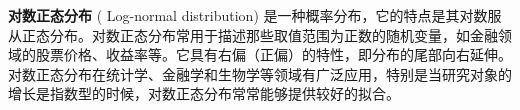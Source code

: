 
\textbf{对数正态分布} (
Log-normal distribution) 是一种概率分布，它的特点是其对数服从正态分布。对数正态分布常用于描述那些取值范围为正数的随机变量，如金融领域的股票价格、收益率等。它具有右偏（正偏）的特性，即分布的尾部向右延伸。对数正态分布在统计学、金融学和生物学等领域有广泛应用，特别是当研究对象的增长是指数型的时候，对数正态分布常常能够提供较好的拟合。

